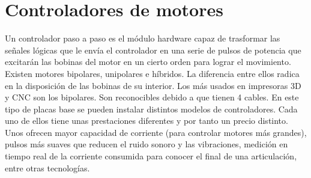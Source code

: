 \section{Controladores de motores}
\label{sec:controladorPAP}
Un controlador paso a paso es el módulo hardware capaz de trasformar las señales lógicas que le envía el controlador en una serie de pulsos de
potencia que excitarán las bobinas del motor en un cierto orden para lograr el movimiento. 
Existen motores bipolares, unipolares e híbridos. La diferencia entre ellos radica en la disposición de las bobinas de su interior. Los más usados 
en impresoras 3D y CNC son los bipolares. Son reconocibles debido a que tienen 4 cables.
En este tipo de placas base se pueden instalar distintos modelos de controladores. Cada uno de ellos tiene unas prestaciones diferentes y por tanto 
un precio distinto. Unos ofrecen mayor capacidad de corriente (para controlar motores más grandes), pulsos más suaves que reducen el 
ruido sonoro y las vibraciones, medición en tiempo real de la corriente consumida para conocer el final de una articulación, entre otras tecnologías.  
